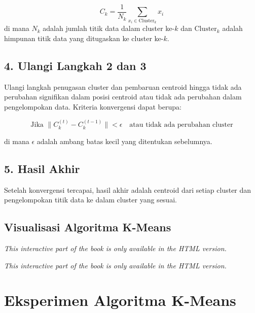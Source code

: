 \documentclass[
  oneside]{book}
\begin{document}
\[
C_k = \frac{1}{N_k} \sum_{x_i \in \text{Cluster}_k} x_i
\]
di mana \(N_k\) adalah jumlah titik data dalam cluster ke-\(k\) dan \(\text{Cluster}_k\) adalah himpunan titik data yang ditugaskan ke cluster ke-\(k\).

\subsection*{4. Ulangi Langkah 2 dan 3}\label{ulangi-langkah-2-dan-3}

Ulangi langkah penugasan cluster dan pembaruan centroid hingga tidak ada perubahan signifikan dalam posisi centroid atau tidak ada perubahan dalam pengelompokan data. Kriteria konvergensi dapat berupa:

\[
\text{Jika } \| C_k^{(t)} - C_k^{(t-1)} \| < \epsilon \quad \text{atau tidak ada perubahan cluster}
\]

di mana \(\epsilon\) adalah ambang batas kecil yang ditentukan sebelumnya.

\subsection*{5. Hasil Akhir}\label{hasil-akhir}

Setelah konvergensi tercapai, hasil akhir adalah centroid dari setiap cluster dan pengelompokan titik data ke dalam cluster yang sesuai.

\subsection*{Visualisasi Algoritma K-Means}\label{visualisasi-algoritma-k-means}

\begin{center}\textit{This interactive part of the book is only available in the HTML version.}\end{center}

\begin{center}\textit{This interactive part of the book is only available in the HTML version.}\end{center}

\section{Eksperimen Algoritma K-Means}\label{eksperimen-algoritma-k-means}
\end{document}
